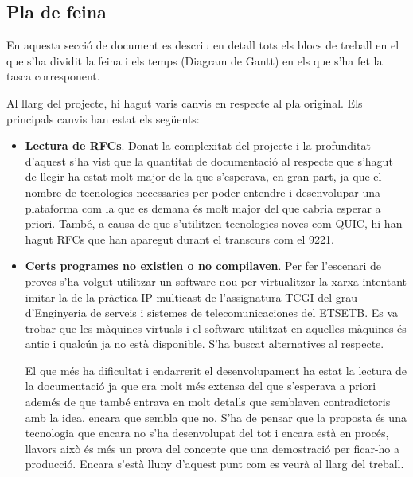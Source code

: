 \subsection{Pla de feina}
{
    En aquesta secció de document es descriu en detall tots els blocs de treball en el que s'ha dividit la feina i els temps (Diagram de Gantt)
    en els que s'ha fet la tasca corresponent.

    Al llarg del projecte, hi hagut varis canvis en respecte al pla original. Els principals canvis han estat els següents:
    \begin{itemize}
        \item \textbf{Lectura de \ac{RFC}s}. Donat la complexitat del projecte i la profunditat d'aquest s'ha vist que la quantitat de documentació
                al respecte que s'hagut de llegir ha estat molt major de la que s'esperava, en gran part, ja que el nombre de tecnologies
                necessaries per poder entendre i desenvolupar una plataforma com la que es demana és molt major del que cabria esperar a priori.
                També, a causa de que s'utilitzen tecnologies noves com QUIC, hi han hagut \ac{RFC}s que han aparegut durant el transcurs com el 9221.
        \item \textbf{Certs programes no existien o no compilaven}. Per fer l'escenari de proves s'ha volgut utilitzar un software nou per virtualitzar
                la xarxa intentant imitar la de la pràctica \ac{IP} multicast de l'assignatura \ac{TCGI} del grau d'Enginyeria de serveis i sistemes
                de telecomunicaciones del \ac{ETSETB}. Es va trobar que les màquines virtuals i el software utilitzat en aquelles màquines és antic i qualcún
                ja no està disponible. S'ha buscat alternatives al respecte.

    El que més ha dificultat i endarrerit el desenvolupament ha estat la lectura de la documentació ja que era molt més extensa del que s'esperava a priori
    ademés de que també entrava en molt detalls que semblaven contradictoris amb la idea, encara que sembla que no. S'ha de pensar que la proposta és una
    tecnologia que encara no s'ha desenvolupat del tot i encara està en procés, llavors això és més un prova del concepte que una demostració per ficar-ho
    a producció. Encara s'està lluny d'aquest punt com es veurà al llarg del treball.
    \end{itemize}
}
